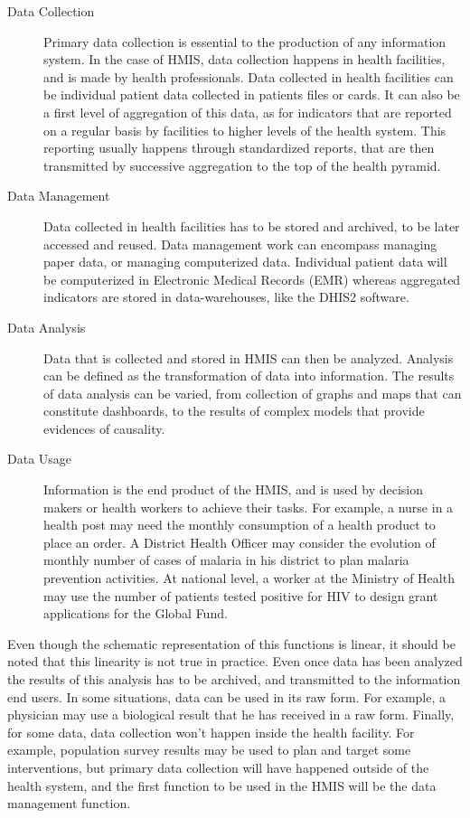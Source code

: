 \documentclass[a4paper,11pt,draft,twoside]{article}
\begin{document}
\begin{description}
\item[Data Collection] Primary data collection is essential to the production of any information system. In the case of HMIS, data collection happens in health facilities, and is made by health professionals. Data collected in health facilities can be individual patient data collected in patients files or cards. It can also be a first level of aggregation of this data, as for indicators that are reported on a regular basis by facilities to higher levels of the health system. This reporting usually happens through standardized reports, that are then transmitted by successive aggregation to the top of the health pyramid.

\item[Data Management] Data collected in health facilities has to be stored and archived, to be later accessed and reused. Data management work can encompass managing paper data, or managing computerized data. Individual patient data will be computerized in Electronic Medical Records (EMR) whereas aggregated indicators are stored in data-warehouses, like the DHIS2 software.

\item[Data Analysis] Data that is collected and stored in HMIS can then be analyzed. Analysis can be defined as the transformation of data into information. The results of data analysis can be varied, from collection of graphs and maps that can constitute dashboards, to the results of complex models that provide evidences of causality.

\item[Data Usage] Information is the end product of the HMIS, and is used by decision makers or health workers to achieve their tasks. For example, a nurse in a health post may need the monthly consumption of a health product to place an order. A District Health Officer may consider the evolution of monthly number of cases of malaria in his district to plan malaria prevention activities. At national level, a worker at the Ministry of Health may use the number of patients tested positive for HIV to design grant applications for the Global Fund.
\end{description}

Even though the schematic representation of this functions is linear, it should be noted that this linearity is not true in practice. Even once data has been analyzed the results of this analysis has to be archived, and transmitted to the information end users. In some situations, data can be used in its raw form. For example, a physician may use a biological result that he has received in a raw form. Finally, for some data, data collection won't happen inside the health  facility. For example, population survey results may be used to plan and target some interventions, but primary data collection will have happened outside of the health system, and the first function to be used in the HMIS will be the data management function.
\end{document}

